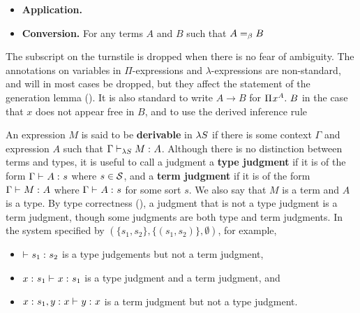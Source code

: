 \documentclass{article}
\begin{document}
\begin{definition}
\begin{itemize}
\item
\textbf{Application.}
\begin{prooftree}
\end{prooftree}

\item
\textbf{Conversion.} For any terms $A$ and $B$ such that $A \eqbeta B$
\begin{prooftree} 
\end{prooftree}
\end{itemize}
\end{definition}

The subscript on the turnstile is dropped when there is no fear of ambiguity.
The annotations on variables in $\Pi$-expressions and $\lambda$-expressions are non-standard, and will in most cases be dropped, but they affect the statement of the generation lemma ().
It is also standard to write $A \to B$ for $\PiT x A B$ in the case that $x$ does not appear free in $B$, and to use the derived inference rule 
\begin{prooftree}
\end{prooftree}

An expression $M$ is said to be \textbf{derivable} in $\lS$ if there is some context $\Gamma$ and expression $A$ such that $\judgment[\lS] \Gamma M A$.
Although there is no distinction between terms and types, it is useful to call a judgment a \textbf{type judgment} if it is of the form $\judgment \Gamma A s$ where $s \in \sorts$, and a \textbf{term judgment} if it is of the form $\judgment \Gamma M A$ where $\judgment \Gamma A s$ for some sort $s$.
We also say that $M$ is a term and $A$ is a type.
By type correctness (), a judgment that is not a type judgment is a term judgment, though some judgments are both type and term judgments.
In the system specified by $(\{s_1, s_2\}, \{(s_1, s_2)\}, \emptyset)$, for example,
\begin{itemize}
    \item $\judgment {} {s_1} {s_2}$ is a type judgements but not a term judgment,
    \item $\judgment {\statement x {s_1}} x {s_1}$ is a type judgment and a term judgment, and
    \item $\judgment {\statement x {s_1}, \statement y x} y x$ is a term judgment but not a type judgment.
\end{itemize}
\end{document}

